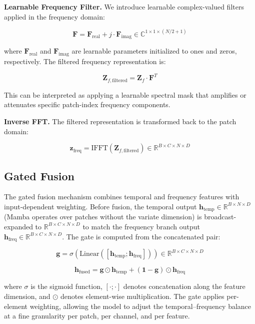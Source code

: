 \documentclass[electronics,article,submit,pdftex,moreauthors]{Definitions/mdpi}
\begin{document}
\textbf{Learnable Frequency Filter.} We introduce learnable complex-valued filters applied in the frequency domain:
\begin{linenomath}
\begin{equation}
\mathbf{F} = \mathbf{F}_{\text{real}} + j \cdot \mathbf{F}_{\text{imag}} \in \mathbb{C}^{1 \times 1 \times (N/2+1)}
\end{equation}
\end{linenomath}
where $\mathbf{F}_{\text{real}}$ and $\mathbf{F}_{\text{imag}}$ are learnable parameters initialized to ones and zeros, respectively. The filtered frequency representation is:
\begin{linenomath}
\begin{equation}
\mathbf{Z}_{f,\text{filtered}} = \mathbf{Z}_f \cdot \mathbf{F}^T
\end{equation}
\end{linenomath}
This can be interpreted as applying a learnable spectral mask that amplifies or attenuates specific patch-index frequency components.

\textbf{Inverse FFT.} The filtered representation is transformed back to the patch domain:
\begin{linenomath}
\begin{equation}
\mathbf{z}_{\text{freq}} = \text{IFFT}(\mathbf{Z}_{f,\text{filtered}}) \in \mathbb{R}^{B \times C \times N \times D}
\end{equation}
\end{linenomath}

\subsection{Gated Fusion}

The gated fusion mechanism combines temporal and frequency features with input-dependent weighting. Before fusion, the temporal output $\mathbf{h}_{\text{temp}} \in \mathbb{R}^{B \times N \times D}$ (Mamba operates over patches without the variate dimension) is broadcast-expanded to $\mathbb{R}^{B \times C \times N \times D}$ to match the frequency branch output $\mathbf{h}_{\text{freq}} \in \mathbb{R}^{B \times C \times N \times D}$. The gate is computed from the concatenated pair:
\begin{linenomath}
\begin{equation}
\mathbf{g} = \sigma(\text{Linear}([\mathbf{h}_{\text{temp}}; \mathbf{h}_{\text{freq}}])) \in \mathbb{R}^{B \times C \times N \times D}
\end{equation}
\end{linenomath}
\begin{linenomath}
\begin{equation}
\mathbf{h}_{\text{fused}} = \mathbf{g} \odot \mathbf{h}_{\text{temp}} + (\mathbf{1} - \mathbf{g}) \odot \mathbf{h}_{\text{freq}}
\end{equation}
\end{linenomath}
where $\sigma$ is the sigmoid function, $[\cdot;\cdot]$ denotes concatenation along the feature dimension, and $\odot$ denotes element-wise multiplication. The gate applies per-element weighting, allowing the model to adjust the temporal--frequency balance at a fine granularity per patch, per channel, and per feature.
\end{document}
